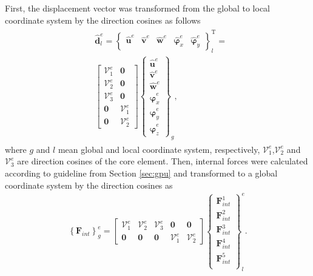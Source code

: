 \documentclass[a4paper,fleqn]{cas-dc}
\begin{document}
First, the displacement vector was transformed from the global to local coordinate system by the direction cosines as follows
\begin{eqnarray}
	\begin{split}
	& \widehat{\textbf{d}}^e_l = \left \{\begin{array}{cccccc}
		\widehat{\textbf{u}}^e & \widehat{\textbf{v}}^e &
		\widehat{\textbf{w}}^e & \widehat{\boldsymbol{\varphi}}_x^e &
		\widehat{\boldsymbol{\varphi}}_y^e
	\end{array}\right \}^{\mathrm{T}}_l = \\
	& \left [\begin{array}{cc}
		\mathcal{V}^e_1 & \textbf{0} \\ \mathcal{V}^e_2 & \textbf{0} \\ \mathcal{V}^e_3 & \textbf{0} \\ \textbf{0} & \mathcal{V}^e_1 \\  \textbf{0} & \mathcal{V}^e_2
	\end{array}\right ]
	\left \{\begin{array}{c}
		\widehat{\textbf{u}}^e \\ \widehat{\textbf{v}}^e \\
		\widehat{\textbf{w}}^e \\ \widehat{\boldsymbol{\varphi}}_x^e \\
		\widehat{\boldsymbol{\varphi}}_y^e\\
		\widehat{\boldsymbol{\varphi}}_z^e
	\end{array}\right \}_g,
	\end{split}
	\label{eq:d_local}
\end{eqnarray}
where \(g\) and \(l\) mean global and local coordinate system, respectively, \(\mathcal{V}^e_1\),\(\mathcal{V}^e_2\) and \(\mathcal{V}^e_3\) are direction cosines of the core element.
Then, internal forces were calculated according to guideline from Section \ref{sec:gpu} and transformed to a global coordinate system by the direction cosines as
\begin{eqnarray}
	\left\{\textbf{F}_{int}\right\}^e_g =
	\left [\begin{array}{ccccc}
		\mathcal{V}^e_1 & \mathcal{V}^e_2 & \mathcal{V}^e_3 & \textbf{0} & \textbf{0} \\
		\textbf{0} & \textbf{0} & \textbf{0} & \mathcal{V}^e_1 & \mathcal{V}^e_2
	\end{array}\right ]
	\left \{\begin{array}{c}
		\textbf{F}^1_{int} \\
		\textbf{F}^2_{int} \\
		\textbf{F}^3_{int} \\
		\textbf{F}^4_{int} \\
		\textbf{F}^5_{int} \\
	\end{array}\right \}_l^e.
	\label{eq:f_global}
\end{eqnarray}
\end{document}
